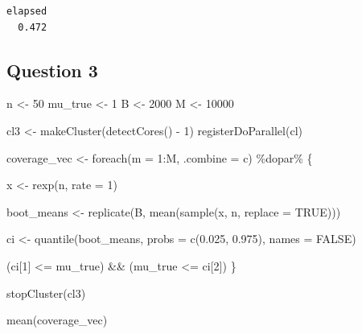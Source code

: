 \documentclass[
  letterpaper,
  DIV=11,
  numbers=noendperiod]{scrreprt}
\newenvironment{Shaded}{\begin{snugshade}}{\end{snugshade}}
\newcommand{\AttributeTok}[1]{\textcolor[rgb]{0.40,0.45,0.13}{#1}}
\newcommand{\ConstantTok}[1]{\textcolor[rgb]{0.56,0.35,0.01}{#1}}
\newcommand{\DecValTok}[1]{\textcolor[rgb]{0.68,0.00,0.00}{#1}}
\newcommand{\FloatTok}[1]{\textcolor[rgb]{0.68,0.00,0.00}{#1}}
\newcommand{\FunctionTok}[1]{\textcolor[rgb]{0.28,0.35,0.67}{#1}}
\newcommand{\NormalTok}[1]{\textcolor[rgb]{0.00,0.23,0.31}{#1}}
\newcommand{\OtherTok}[1]{\textcolor[rgb]{0.00,0.23,0.31}{#1}}
\newcommand{\SpecialCharTok}[1]{\textcolor[rgb]{0.37,0.37,0.37}{#1}}
\begin{document}
\begin{verbatim}
elapsed 
  0.472 
\end{verbatim}

\subsection{Question 3}\label{question-3}

\begin{Shaded}
\begin{Highlighting}[]
\NormalTok{n }\OtherTok{\textless{}{-}} \DecValTok{50}
\NormalTok{mu\_true }\OtherTok{\textless{}{-}} \DecValTok{1}
\NormalTok{B }\OtherTok{\textless{}{-}} \DecValTok{2000}
\NormalTok{M }\OtherTok{\textless{}{-}} \DecValTok{10000}

\NormalTok{cl3 }\OtherTok{\textless{}{-}} \FunctionTok{makeCluster}\NormalTok{(}\FunctionTok{detectCores}\NormalTok{() }\SpecialCharTok{{-}} \DecValTok{1}\NormalTok{)}
\FunctionTok{registerDoParallel}\NormalTok{(cl)}

\NormalTok{coverage\_vec }\OtherTok{\textless{}{-}} \FunctionTok{foreach}\NormalTok{(}\AttributeTok{m =} \DecValTok{1}\SpecialCharTok{:}\NormalTok{M, }\AttributeTok{.combine =}\NormalTok{ c) }\SpecialCharTok{\%dopar\%}\NormalTok{ \{}

\NormalTok{  x }\OtherTok{\textless{}{-}} \FunctionTok{rexp}\NormalTok{(n, }\AttributeTok{rate =} \DecValTok{1}\NormalTok{)}

\NormalTok{  boot\_means }\OtherTok{\textless{}{-}} \FunctionTok{replicate}\NormalTok{(B, }\FunctionTok{mean}\NormalTok{(}\FunctionTok{sample}\NormalTok{(x, n, }\AttributeTok{replace =} \ConstantTok{TRUE}\NormalTok{)))}

\NormalTok{  ci }\OtherTok{\textless{}{-}} \FunctionTok{quantile}\NormalTok{(boot\_means, }\AttributeTok{probs =} \FunctionTok{c}\NormalTok{(}\FloatTok{0.025}\NormalTok{, }\FloatTok{0.975}\NormalTok{), }\AttributeTok{names =} \ConstantTok{FALSE}\NormalTok{)}

\NormalTok{  (ci[}\DecValTok{1}\NormalTok{] }\SpecialCharTok{\textless{}=}\NormalTok{ mu\_true) }\SpecialCharTok{\&\&}\NormalTok{ (mu\_true }\SpecialCharTok{\textless{}=}\NormalTok{ ci[}\DecValTok{2}\NormalTok{])}
\NormalTok{\}}

\FunctionTok{stopCluster}\NormalTok{(cl3)}

\FunctionTok{mean}\NormalTok{(coverage\_vec)}
\end{Highlighting}
\end{Shaded}
\end{document}
